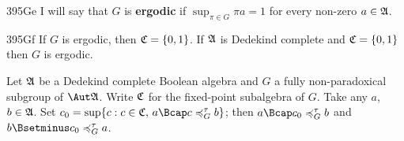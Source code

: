\spheader 395Ge
I will say that $G$ is {\bf ergodic} if $\sup_{\pi\in G}\pi a=1$
for every non-zero $a\in\frak A$.

\spheader 395Gf If $G$ is ergodic, then $\frak C=\{0,1\}$.
If $\frak A$ is Dedekind complete and $\frak C=\{0,1\}$
then $G$ is ergodic.   

 Let $\frak A$ be a Dedekind complete Boolean
algebra and $G$ a fully non-paradoxical subgroup of $\Aut\frak A$.
Write $\frak C$ for the
fixed-point subalgebra of $G$.   Take any $a$, $b\in\frak A$.   Set
$c_0=\sup\{c:c\in\frak C,\,a\Bcap c\ptG b\}$;  then $a\Bcap c_0\ptG b$
and $b\Bsetminus c_0\ptG a$.

